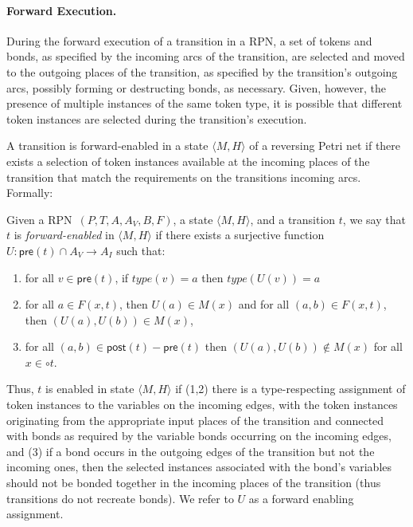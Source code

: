 \documentclass[runningheads]{llncs}
\newcommand{\PN}{reversing Petri net }
\newcommand{\guard}[1]{\mathsf{pre}(#1)}
\newcommand{\effects}[1]{\mathsf{post}(#1)}
\newcommand{\state}[2]{\langle {#1}, {#2}\rangle}
\newcommand{\RPN}{\textsc{RPN\ }}
\newcommand{\type}{\mathit{type}}
\begin{document}
\paragraph{Forward Execution.}
During the forward execution of a transition in a RPN, 
a set of tokens and bonds, as specified by the incoming arcs of the transition, are selected and
moved to the outgoing places of the transition, as specified by the transition's outgoing arcs, possibly
forming or destructing bonds, as necessary. Given, however, the presence of multiple instances of the same token
type, it is possible that different token instances are selected during the transition's execution.  


A transition is forward-enabled in a state $\state{M}{H}$ of a \PN if there exists a selection of token instances 
available at the incoming places of the transition that 
match the requirements  on the transitions incoming arcs. Formally:

\begin{definition}\label{fenabled}{\rm
		Given a \RPN $(P,T, A, A_V, B, F)$, a state $\state{M}{H}$, and a transition $t$, we say that $t$ is 
		\emph{forward-enabled} in $\state{M}{H}$  if there exists a surjective function 
		$U:\guard{t}\cap A_V\rightarrow A_I$ such that:
		
		\begin{enumerate}
			\item  for all $v\in\guard{t}$, if $\type(v) = a$	then $\type(U(v))=a$
			\item for all $a\in F(x,t)$, then $U(a)\in M(x)$ and for all $(a,b)\in F(x,t)$, then $(U(a),U(b))\in M(x)$, 
			\item for all
			$(a,b)\in \effects{t}-\guard{t}$ then $(U(a),U(b))\not\in M(x)$ for all $x\in\circ t$.
		\end{enumerate}
}\end{definition}

Thus, $t$ is enabled in state $\state{M}{H}$ if  (1,2) there is a type-respecting assignment of token instances
to the variables on the incoming edges, with the token instances originating from the appropriate
input places of the transition and  connected with
bonds as required by the variable bonds occurring on the incoming edges, and (3) if a bond
occurs in the outgoing edges of the transition but not the incoming ones, then the selected instances
associated with the bond's variables should not be bonded together in the incoming places
of the transition (thus transitions do not recreate bonds). We refer to $U$ as a forward enabling 
assignment.
\end{document}
